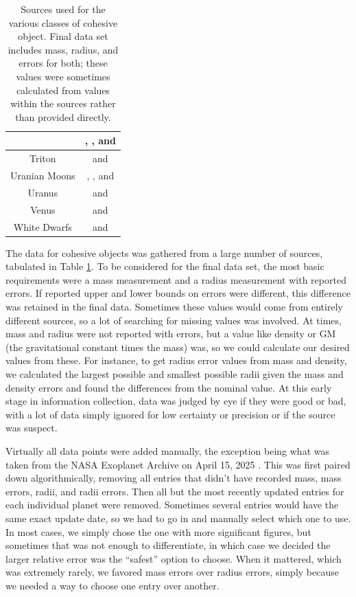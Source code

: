 \documentclass[twocolumn,linenumbers]{aastex631}
\begin{document}
\begin{table}[p]
\begin{tabular}{|c|c|}
& \cite{Sicardy2011}, \cite{Souami2020}, and \cite{Stern2018} \\
\hline
Triton & \cite{Jacobson2009} and \cite{Thomas2000} \\
\hline
Uranian Moons & \cite{French2024}, \cite{Jacobson2014}, and \cite{Thomas1988} \\
\hline
Uranus & \cite{Archinal2018} and \cite{Jacobson2014} \\
\hline
Venus & \cite{Archinal2018} and \cite{Konopliv1999} \\
\hline
White Dwarfs & \cite{Parsons2017} and \cite{Bond2017} \\
\hline
\end{tabular}
\caption{Sources used for the various classes of cohesive object. Final data set includes mass, radius, and errors for both; these values were sometimes calculated from values within the sources rather than provided directly.}
\label{table:1}
\end{table}

The data for cohesive objects was gathered from a large number of sources, tabulated in Table \ref{table:1}. To be considered for the final data set, the most basic requirements were a mass measurement and a radius measurement with reported errors. If reported upper and lower bounds on errors were different, this difference was retained in the final data. Sometimes these values would come from entirely different sources, so a lot of searching for missing values was involved. At times, mass and radius were not reported with errors, but a value like density or GM (the gravitational constant times the mass) was, so we could calculate our desired values from these. For instance, to get radius error values from mass and density, we calculated the largest possible and smallest possible radii given the mass and density errors and found the differences from the nominal value. At this early stage in information collection, data was judged by eye if they were good or bad, with a lot of data simply ignored for low certainty or precision or if the source was suspect. 

Virtually all data points were added manually, the exception being what was taken from the NASA Exoplanet Archive on April 15, 2025 \citep{NASAExoplanetArchive}. This was first paired down algorithmically, removing all entries that didn't have recorded mass, mass errors, radii, and radii errors. Then all but the most recently updated entries for each individual planet were removed. Sometimes several entries would have the same exact update date, so we had to go in and manually select which one to use. In most cases, we simply chose the one with more significant figures, but sometimes that was not enough to differentiate, in which case we decided the larger relative error was the ``safest'' option to choose. When it mattered, which was extremely rarely, we favored mass errors over radius errors, simply because we needed a way to choose one entry over another.
\end{document}
